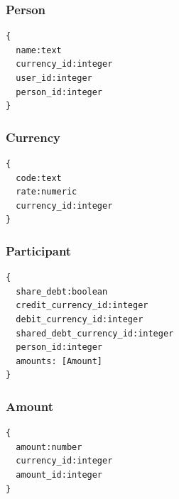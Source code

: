 \documentclass[a4paper,parskip=half]{scrartcl}
\begin{document}
\subsubsection{Person}
\begin{Verbatim}
{
  name:text
  currency_id:integer
  user_id:integer
  person_id:integer
}
\end{Verbatim}

\subsubsection{Currency}
\begin{Verbatim}
{
  code:text
  rate:numeric
  currency_id:integer
}
\end{Verbatim}

\subsubsection{Participant}
\begin{Verbatim}
{
  share_debt:boolean
  credit_currency_id:integer
  debit_currency_id:integer
  shared_debt_currency_id:integer
  person_id:integer
  amounts: [Amount]
}
\end{Verbatim}

\subsubsection{Amount}
\begin{Verbatim}
{
  amount:number
  currency_id:integer
  amount_id:integer
}
\end{Verbatim}



\end{document}
